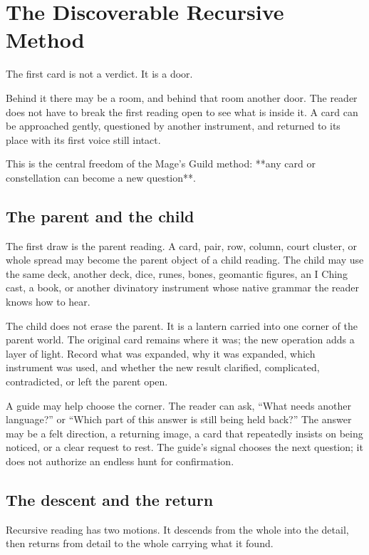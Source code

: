 \chapter{The Discoverable Recursive Method}

The first card is not a verdict. It is a door.

Behind it there may be a room, and behind that room another door. The reader
does not have to break the first reading open to see what is inside it. A card
can be approached gently, questioned by another instrument, and returned to
its place with its first voice still intact.

This is the central freedom of the Mage's Guild method: **any card or
constellation can become a new question**.

\section{The parent and the child}

The first draw is the parent reading. A card, pair, row, column, court cluster,
or whole spread may become the parent object of a child reading. The child may
use the same deck, another deck, dice, runes, bones, geomantic figures, an I
Ching cast, a book, or another divinatory instrument whose native grammar the
reader knows how to hear.

The child does not erase the parent. It is a lantern carried into one corner of
the parent world. The original card remains where it was; the new operation
adds a layer of light. Record what was expanded, why it was expanded, which
instrument was used, and whether the new result clarified, complicated,
contradicted, or left the parent open.

A guide may help choose the corner. The reader can ask, ``What needs another
language?'' or ``Which part of this answer is still being held back?'' The
answer may be a felt direction, a returning image, a card that repeatedly
insists on being noticed, or a clear request to rest. The guide's signal chooses
the next question; it does not authorize an endless hunt for confirmation.

\section{The descent and the return}

Recursive reading has two motions. It descends from the whole into the detail,
then returns from detail to the whole carrying what it found.

